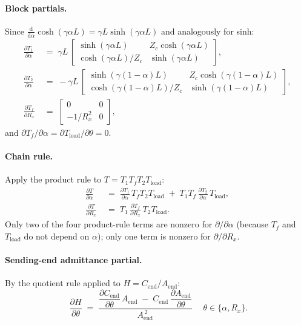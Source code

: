 \documentclass[11pt,a4paper]{article}
\begin{document}
\paragraph{Block partials.}
Since $\frac{\mathrm{d}}{\mathrm{d}\alpha}\cosh(\gamma\alpha L)
= \gamma L \sinh(\gamma\alpha L)$ and analogously for sinh:
\begin{align}
\frac{\partial T_1}{\partial \alpha}
   &\;=\; \gamma L\,
   \begin{bmatrix}
     \sinh(\gamma\alpha L) & Z_c \cosh(\gamma\alpha L)\\
     \cosh(\gamma\alpha L)/Z_c & \sinh(\gamma\alpha L)
   \end{bmatrix},\\[4pt]
\frac{\partial T_2}{\partial \alpha}
   &\;=\; -\gamma L\,
   \begin{bmatrix}
     \sinh(\gamma(1{-}\alpha)L) & Z_c \cosh(\gamma(1{-}\alpha)L)\\
     \cosh(\gamma(1{-}\alpha)L)/Z_c & \sinh(\gamma(1{-}\alpha)L)
   \end{bmatrix},\\[4pt]
\frac{\partial T_f}{\partial R_x}
   &\;=\;
   \begin{bmatrix} 0 & 0 \\ -1/R_x^{2} & 0 \end{bmatrix},
\end{align}
and $\partial T_f/\partial\alpha = \partial T_{\text{load}}/\partial\theta = 0$.

\paragraph{Chain rule.}
Apply the product rule to $T = T_1 T_f T_2 T_{\text{load}}$:
\begin{align}
\frac{\partial T}{\partial \alpha}
   &\;=\; \frac{\partial T_1}{\partial \alpha}\, T_f T_2 T_{\text{load}}
       \;+\; T_1 T_f \,\frac{\partial T_2}{\partial \alpha}\, T_{\text{load}},
\\[4pt]
\frac{\partial T}{\partial R_x}
   &\;=\; T_1 \,\frac{\partial T_f}{\partial R_x}\, T_2 T_{\text{load}}.
\end{align}
Only two of the four product-rule terms are nonzero for
$\partial/\partial\alpha$ (because $T_f$ and $T_{\text{load}}$ do
not depend on $\alpha$); only one term is nonzero for
$\partial/\partial R_x$.

\paragraph{Sending-end admittance partial.}
By the quotient rule applied to $H = C_{\text{end}}/A_{\text{end}}$:
\begin{equation}
\boxed{\;
\frac{\partial H}{\partial \theta} \;=\;
\frac{
   \dfrac{\partial C_{\text{end}}}{\partial \theta}\, A_{\text{end}}
   \;-\;
   C_{\text{end}}\, \dfrac{\partial A_{\text{end}}}{\partial \theta}
}{A_{\text{end}}^{\,2}}
\;}
\quad \theta\in\{\alpha, R_x\}.
\label{eq:dHdtheta_quotient}
\end{equation}
\end{document}
